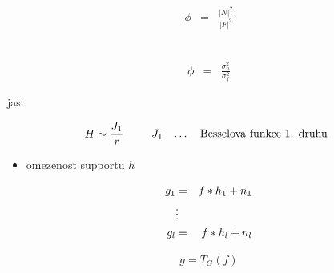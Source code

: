 \begin{eqnarray}
\phi&=&\frac{|N|^2}{|F|^2}
\end{eqnarray}


\begin{eqnarray}
\end{eqnarray}

\begin{eqnarray}
\phi&=&\frac{\sigma_n^2}{\sigma_f^2}
\end{eqnarray}



\begin{itemize}
\end{itemize}

\begin{itemize}
jas. 
\end{itemize}


\begin{itemize}
\end{itemize}




\begin{itemize}
  \begin{eqnarray}
    H\sim \frac{J_1}{r}\label{bessel}\qquad\begin{array}{ccl}\hbox{$J_1$}&\hbox{\dots}&\hbox{Besselova funkce 1. druhu}\\
    \end{array}
  \end{eqnarray}

\end{itemize}

\begin{itemize}
\end{itemize}


\begin{itemize}
\item omezenost supportu $h$
\end{itemize}

\begin{eqnarray}
g_1&=&f\ast h_1+n_1\\
&\vdots&\nonumber\\
g_l&=&f\ast h_l+n_l
\end{eqnarray}



\begin{eqnarray}
g=T_G(f)
\end{eqnarray}




\begin{itemize}
\end{itemize}




